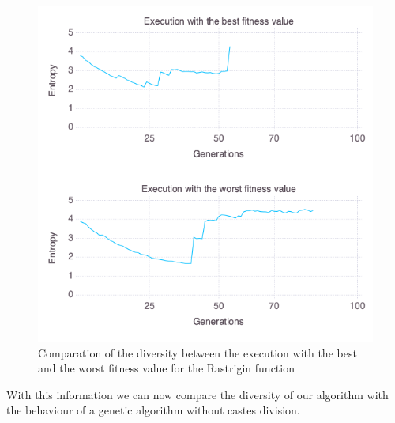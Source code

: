 \begin{figure}[]
	\centering	
	\includegraphics[scale=0.5]{./figures/config_file_10_Rastrigin_diversity_comparation.png}
	\caption{ Comparation of the diversity between the execution with the best and the worst fitness value for the Rastrigin function }
    \label{fig:rastrigin_diversity_comparation}
\end{figure}

With this information we can now compare the diversity of our algorithm with the behaviour of a genetic algorithm without
castes division.